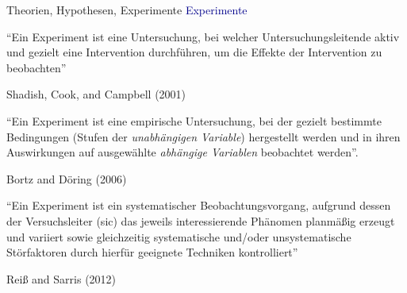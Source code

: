 \documentclass[
  8pt,
  ignorenonframetext,
]{beamer}
\begin{document}
\begin{frame}{Theorien, Hypothesen, Experimente}
\protect\hypertarget{theorien-hypothesen-experimente-5}{}
\textcolor{darkblue}{Experimente} \small

``Ein Experiment ist eine Untersuchung, bei welcher
Untersuchungsleitende aktiv und gezielt eine Intervention durchführen,
um die Effekte der Intervention zu beobachten''

\flushright

Shadish, Cook, and Campbell (2001) \vspace{2mm}

\justifying

``Ein Experiment ist eine empirische Untersuchung, bei der gezielt
bestimmte Bedingungen (Stufen der \emph{unabhängigen Variable})
hergestellt werden und in ihren Auswirkungen auf ausgewählte
\emph{abhängige Variablen} beobachtet werden''.

\flushright

Bortz and Döring (2006) \vspace{2mm}

\justifying

``Ein Experiment ist ein systematischer Beobachtungsvorgang, aufgrund
dessen der Versuchsleiter (sic) das jeweils interessierende Phänomen
planmäßig erzeugt und variiert sowie gleichzeitig systematische und/oder
unsystematische Störfaktoren durch hierfür geeignete Techniken
kontrolliert''

\flushright

Reiß and Sarris (2012)
\end{frame}
\end{document}
